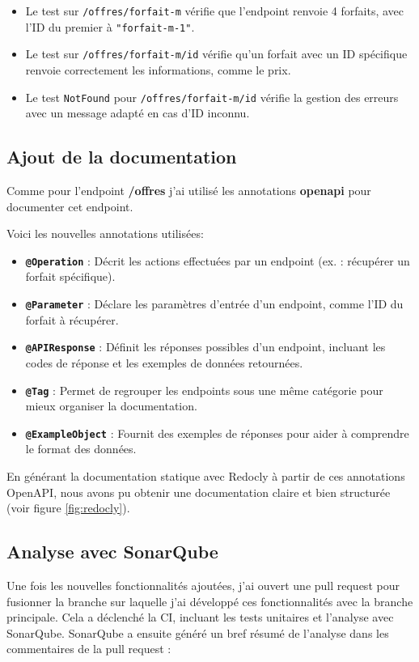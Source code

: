 \documentclass{article}
\begin{document}
	\begin{itemize}
		\item Le test sur \texttt{/offres/forfait-m} vérifie que l'endpoint renvoie 4 forfaits, avec l'ID du premier à \texttt{"forfait-m-1"}.
		\item Le test sur \texttt{/offres/forfait-m/{id}} vérifie qu'un forfait avec un ID spécifique renvoie correctement les informations, comme le prix.
		\item Le test \texttt{NotFound} pour \texttt{/offres/forfait-m/{id}} vérifie la gestion des erreurs avec un message adapté en cas d'ID inconnu.
	\end{itemize}

	\subsection{Ajout de la documentation}
	\label{subsec:doc}
	
	Comme pour l'endpoint \textbf{/offres} j'ai utilisé les annotations \textbf{openapi} pour documenter cet endpoint.
	
	Voici les nouvelles annotations utilisées:
	
	\begin{itemize}
		\item \textbf{\texttt{@Operation}} : Décrit les actions effectuées par un endpoint (ex. : récupérer un forfait spécifique).
		\item \textbf{\texttt{@Parameter}} : Déclare les paramètres d'entrée d'un endpoint, comme l'ID du forfait à récupérer.
		\item \textbf{\texttt{@APIResponse}} : Définit les réponses possibles d'un endpoint, incluant les codes de réponse et les exemples de données retournées.
		\item \textbf{\texttt{@Tag}} : Permet de regrouper les endpoints sous une même catégorie pour mieux organiser la documentation.
		\item \textbf{\texttt{@ExampleObject}} : Fournit des exemples de réponses pour aider à comprendre le format des données.
	\end{itemize}
	
	En générant la documentation statique avec Redocly à partir de ces annotations OpenAPI, nous avons pu obtenir une documentation claire et bien structurée (voir figure \ref{fig:redocly}).
	
	\subsection{Analyse avec SonarQube}
	\label{analyse:sonar}
	Une fois les nouvelles fonctionnalités ajoutées, j'ai ouvert une pull request pour fusionner la branche sur laquelle j'ai développé ces fonctionnalités avec la branche principale. Cela a déclenché la CI, incluant les tests unitaires et l'analyse avec SonarQube. SonarQube a ensuite généré un bref résumé de l'analyse dans les commentaires de la pull request : 
	
\end{document}
